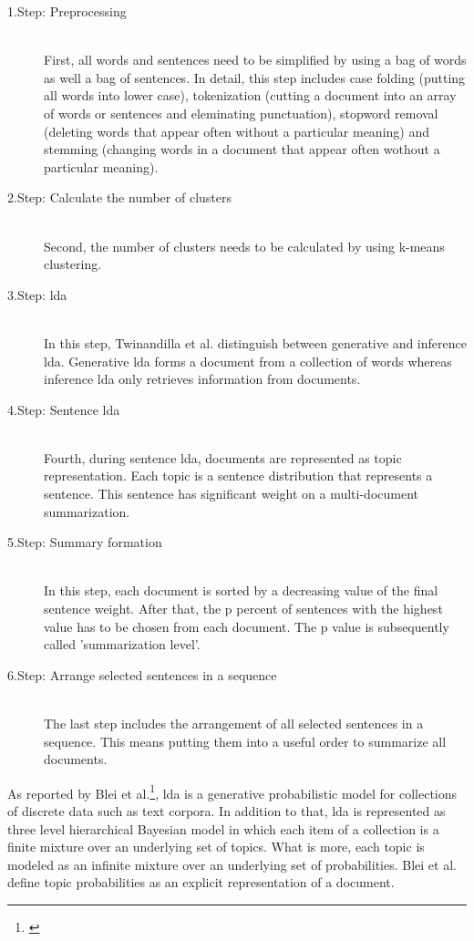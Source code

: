 \begin{description}
\item[1.Step: Preprocessing]\hfill \\
First, all words and sentences need to be simplified by using a bag of words as well a bag of sentences. In detail, this step includes case folding (putting all words into lower case), tokenization (cutting a document into an array of words or sentences and eleminating punctuation), stopword removal (deleting words that appear often without a particular meaning) and stemming (changing words in a document that appear often wothout a particular meaning).

\item[2.Step: Calculate the number of clusters]\hfill \\
Second, the number of clusters needs to be calculated by using k-means clustering. 

\item[3.Step: \gls{lda}]\hfill \\
In this step, Twinandilla et al. distinguish between generative and inference \gls{lda}. Generative \gls{lda} forms a document from a collection of words whereas inference \gls{lda} only retrieves information from documents.

\item[4.Step: Sentence \gls{lda}]\hfill \\
Fourth, during sentence \gls{lda}, documents are represented as topic representation. Each topic is a sentence distribution that represents a sentence. This sentence has significant weight on a multi-document summarization.

\item[5.Step: Summary formation]\hfill \\
In this step, each document is sorted by a decreasing value of the final sentence weight. After that, the p percent of sentences with the highest value has to be chosen from each document. The p value is subsequently called 'summarization level'.

\item[6.Step: Arrange selected sentences in a sequence]\hfill \\
The last step includes the arrangement of all selected sentences in a sequence. This means putting them into a useful order to summarize all documents.
\end{description}

As reported by Blei et al.\footnote{\autocite{blei_2003}}, \gls{lda} is a generative probabilistic model for collections of discrete data such as text corpora. In addition to that, \gls{lda} is represented as three level hierarchical Bayesian model in which each item of a collection is a finite mixture over an underlying set of topics. What is more, each topic is modeled as an infinite mixture over an underlying set of probabilities. Blei et al. define topic probabilities as an explicit representation of a document.

